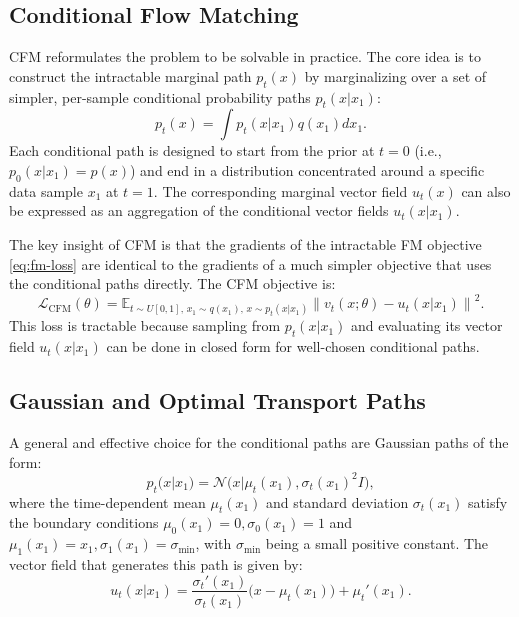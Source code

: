 \documentclass[
  manuscript=proceedings,  %
  layout=preprint,  %
  year=20xx,
  volume=x,
]{extra/joas}
\begin{document}
\subsection{Conditional Flow Matching}
CFM reformulates the problem to be solvable in practice. The core idea is to construct the intractable marginal path $p_t(x)$ by marginalizing over a set of simpler, per-sample conditional probability paths $p_t(x|x_1)$:
$$p_t(x) = \int p_t(x|x_1)q(x_1)dx_1.$$
Each conditional path is designed to start from the prior at $t=0$ (i.e., $p_0(x|x_1) = p(x)$) and end in a distribution concentrated around a specific data sample $x_1$ at $t=1$. The corresponding marginal vector field $u_t(x)$ can also be expressed as an aggregation of the conditional vector fields $u_t(x|x_1)$.

The key insight of CFM is that the gradients of the intractable FM objective \eqref{eq:fm-loss} are identical to the gradients of a much simpler objective that uses the conditional paths directly. The CFM objective is:
\begin{equation}
\mathcal{L}_{\mathrm{CFM}}(\theta) = \mathbb{E}_{t \sim U[0,1],\,x_1 \sim q(x_1),\,x \sim p_t(x|x_1)} \left\lVert v_t(x;\theta) - u_t(x|x_1) \right\rVert^2.
\label{eq:cfm-loss}
\end{equation}
This loss is tractable because sampling from $p_t(x|x_1)$ and evaluating its vector field $u_t(x|x_1)$ can be done in closed form for well-chosen conditional paths.

\subsection{Gaussian and Optimal Transport Paths}
A general and effective choice for the conditional paths are Gaussian paths of the form:
$$p_t(x|x_1) = \mathcal{N}\big(x|\mu_t(x_1), \sigma_t(x_1)^2 I\big),$$
where the time-dependent mean $\mu_t(x_1)$ and standard deviation $\sigma_t(x_1)$ satisfy the boundary conditions $\mu_0(x_1)=0, \sigma_0(x_1)=1$ and $\mu_1(x_1)=x_1, \sigma_1(x_1)=\sigma_{\min}$, with $\sigma_{\min}$ being a small positive constant. The vector field that generates this path is given by:
\begin{equation}
u_t(x|x_1) = \frac{\sigma_t'(x_1)}{\sigma_t(x_1)}\big(x - \mu_t(x_1)\big) + \mu_t'(x_1).
\label{eq:cfm-vectorfield}
\end{equation}
\end{document}
